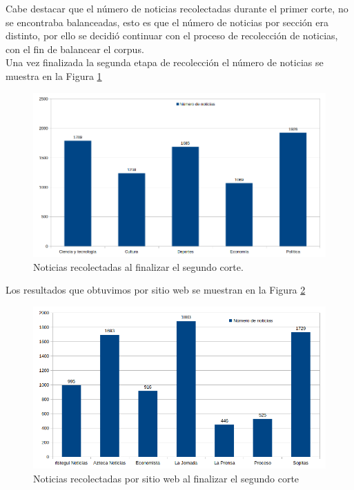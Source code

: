 Cabe destacar que el número de noticias recolectadas durante el primer corte, no se encontraba balanceadas, esto es que el número de noticias por sección era distinto, por ello se decidió continuar con el proceso de recolección de noticias, con el fin de balancear el corpus.
\\
Una vez finalizada la segunda etapa de recolección el número de noticias se muestra en la Figura \ref{Fig:notseccion} 

\begin{figure}[H]
	\centering
	\includegraphics[scale=.35]{imagenes/Capitulo5/noticiasPorSeccionV2.png}
	\caption{Noticias recolectadas al finalizar el segundo corte.}
	\label{Fig:notseccion}
\end{figure}

Los resultados que obtuvimos por sitio web se muestran en la Figura \ref{Fig:notPorSit} 

\begin{figure}[H]
	\centering
	\includegraphics[scale=.35]{imagenes/Capitulo5/noticiasPorSitio.png}
	\caption{Noticias recolectadas por sitio web al finalizar el segundo corte}
	\label{Fig:notPorSit}
\end{figure}


